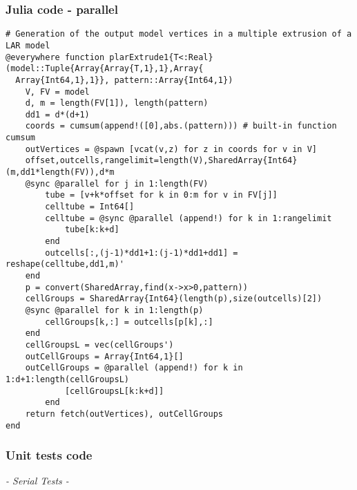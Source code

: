 \documentclass[a4paper,12pt,titlepage]{article}					%
\begin{document}
\subsubsection{Julia code - parallel}
\begin{Verbatim}
# Generation of the output model vertices in a multiple extrusion of a LAR model
@everywhere function plarExtrude1{T<:Real}(model::Tuple{Array{Array{T,1},1},Array{
  Array{Int64,1},1}}, pattern::Array{Int64,1})
	V, FV = model
	d, m = length(FV[1]), length(pattern)
	dd1 = d*(d+1)
	coords = cumsum(append!([0],abs.(pattern))) # built-in function cumsum
	outVertices = @spawn [vcat(v,z) for z in coords for v in V]
	offset,outcells,rangelimit=length(V),SharedArray{Int64}(m,dd1*length(FV)),d*m
	@sync @parallel for j in 1:length(FV)
		tube = [v+k*offset for k in 0:m for v in FV[j]]
		celltube = Int64[]
		celltube = @sync @parallel (append!) for k in 1:rangelimit
			tube[k:k+d]
		end
		outcells[:,(j-1)*dd1+1:(j-1)*dd1+dd1] = reshape(celltube,dd1,m)'
	end
	p = convert(SharedArray,find(x->x>0,pattern))
	cellGroups = SharedArray{Int64}(length(p),size(outcells)[2])
	@sync @parallel for k in 1:length(p)
		cellGroups[k,:] = outcells[p[k],:]
	end
	cellGroupsL = vec(cellGroups')
	outCellGroups = Array{Int64,1}[]
	outCellGroups = @parallel (append!) for k in 1:d+1:length(cellGroupsL)
			[cellGroupsL[k:k+d]]
		end
	return fetch(outVertices), outCellGroups
end
\end{Verbatim}

\subsubsection{Unit tests code}
\emph{- Serial Tests -}
\end{document}
